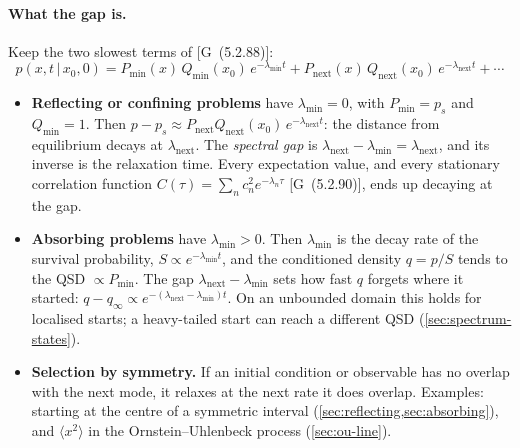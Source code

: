 \documentclass[11pt]{article}
\numberwithin{equation}{section}
\newcommand{\avg}[1]{\langle #1\rangle}
\newcommand{\given}{\,|\,}
\newcommand{\G}[1]{[G~(#1)]}
\begin{document}
\paragraph{What the gap is.} Keep the two slowest terms of \G{5.2.88}:
\begin{equation}
  p(x,t\given x_0,0)=P_{\min}(x)\,Q_{\min}(x_0)\,e^{-\lambda_{\min}t}
  +P_{\text{next}}(x)\,Q_{\text{next}}(x_0)\,e^{-\lambda_{\text{next}}t}+\cdots
  \label{eq:gap-expansion}
\end{equation}
\begin{itemize}
  \item \textbf{Reflecting or confining problems} have $\lambda_{\min}=0$, with $P_{\min}=p_s$ and $Q_{\min}=1$.
        Then $p-p_s\approx P_{\text{next}}Q_{\text{next}}(x_0)\,e^{-\lambda_{\text{next}}t}$: the distance from
        equilibrium decays at $\lambda_{\text{next}}$. The \emph{spectral gap} is
        $\lambda_{\text{next}}-\lambda_{\min}=\lambda_{\text{next}}$, and its inverse is the relaxation time.
        Every expectation value, and every stationary correlation function
        $C(\tau)=\sum_nc_n^2e^{-\lambda_n\tau}$ \G{5.2.90}, ends up decaying at the gap.
  \item \textbf{Absorbing problems} have $\lambda_{\min}>0$. Then $\lambda_{\min}$ is the decay rate of the
        survival probability, $S\propto e^{-\lambda_{\min}t}$, and the conditioned density $q=p/S$ tends to the
        QSD $\propto P_{\min}$. The gap $\lambda_{\text{next}}-\lambda_{\min}$ sets how fast $q$ forgets where
        it started: $q-q_\infty\propto e^{-(\lambda_{\text{next}}-\lambda_{\min})t}$. On an unbounded domain
        this holds for localised starts; a heavy-tailed start can reach a different QSD
        (\cref{sec:spectrum-states}).
  \item \textbf{Selection by symmetry.} If an initial condition or observable has no overlap with the next
        mode, it relaxes at the next rate it does overlap. Examples: starting at the centre of a symmetric
        interval (\cref{sec:reflecting,sec:absorbing}), and $\avg{x^2}$ in the Ornstein--Uhlenbeck process
        (\cref{sec:ou-line}).
\end{itemize}
\end{document}
